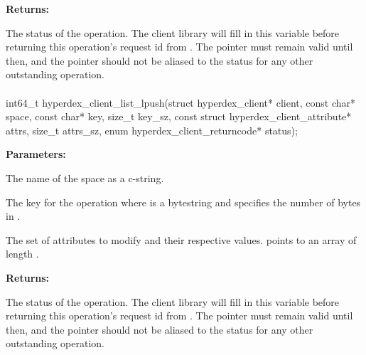 \noindent\textbf{Returns:}
\begin{description}[labelindent=\widthof{{\code{status}}},leftmargin=*,noitemsep,nolistsep,align=right]
\item[\code{status}] The status of the operation.  The client library will fill in this variable before returning this operation's request id from .  The pointer must remain valid until then, and the pointer should not be aliased to the status for any other outstanding operation.
\end{description}

\paragraph{}
\label{api:c:list_lpush}
\begin{ccode}
int64_t hyperdex_client_list_lpush(struct hyperdex_client* client,
                const char* space,
                const char* key, size_t key_sz,
                const struct hyperdex_client_attribute* attrs, size_t attrs_sz,
                enum hyperdex_client_returncode* status);
\end{ccode}
\funcdesc 

\noindent\textbf{Parameters:}
\begin{description}[labelindent=\widthof{{\code{attrs}, \code{attrs\_sz}}},leftmargin=*,noitemsep,nolistsep,align=right]
\item[\code{space}] The name of the space as a c-string.
\item[\code{key}, \code{key\_sz}] The key for the operation where  is a bytestring and  specifies the number of bytes in .
\item[\code{attrs}, \code{attrs\_sz}] The set of attributes to modify and their respective values.   points to an array of length .
\end{description}

\noindent\textbf{Returns:}
\begin{description}[labelindent=\widthof{{\code{status}}},leftmargin=*,noitemsep,nolistsep,align=right]
\item[\code{status}] The status of the operation.  The client library will fill in this variable before returning this operation's request id from .  The pointer must remain valid until then, and the pointer should not be aliased to the status for any other outstanding operation.
\end{description}

